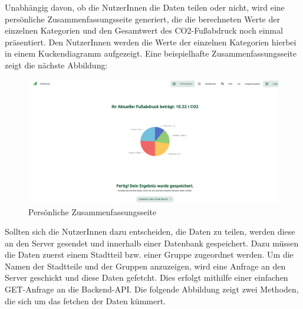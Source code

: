 Unabhängig davon, ob die NutzerInnen die Daten teilen oder nicht, wird eine persönliche Zusammenfassungsseite generiert, die die berechneten Werte der einzelnen Kategorien und den Gesamtwert des CO2-Fußabdruck noch einmal präsentiert. Den NutzerInnen werden die Werte der einzelnen Kategorien hierbei in einem Kuckendiagramm aufgezeigt. Eine beispielhafte Zusammenfassungsseite zeigt die nächste Abbildung:

\begin{figure}[H]
    \centering
    \includegraphics[width=1\textwidth]{images/06/persoenliche-zusammenfassung.png}
    \caption{Persönliche Zusammenfassungsseite}
    \label{fig:persnöliche-zusammenfassungs}
\end{figure}

Sollten sich die NutzerInnen dazu entscheiden, die Daten zu teilen, werden diese an den Server gesendet und innerhalb einer Datenbank gespeichert. Dazu müssen die Daten zuerst einem Stadtteil bzw. einer Gruppe zugeordnet werden. Um die Namen der Stadtteile und der Gruppen anzuzeigen, wird eine Anfrage an den Server geschickt und diese Daten gefetcht. Dies erfolgt mithilfe einer einfachen GET-Anfrage an die Backend-API. Die folgende Abbildung zeigt zwei Methoden, die sich um das fetchen der Daten kümmert.

